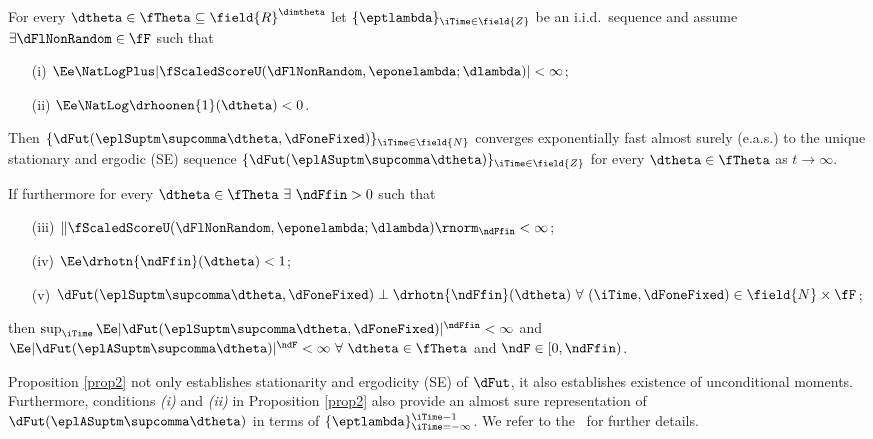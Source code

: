 \begin{prop} \label{prop2} 
For every $\dtheta \in  \fTheta\subseteq \field{R}^{\dimtheta}$ let  
$\{\eptlambda\}_{\iTime \in \field{Z}}$ be an i.i.d.\ sequence and assume
$\exists \dFlNonRandom \in  \fF$  such that 
\begin{enumerate}
    \item[(i)] $\Ee \NatLogPlus |\fScaledScoreU(\dFlNonRandom,\eponelambda;\dlambda)| <\infty$;
    \item[(ii)] $\Ee \NatLog \drhoonen{1}(\dtheta) < 0$.
\end{enumerate}
Then 
$\{ \dFut(\eplSuptm\supcomma\dtheta,\dFoneFixed) \}_{\iTime \in \field{N}}$ 
converges exponentially fast almost surely (e.a.s.) to the unique stationary and ergodic (SE) sequence 
$\{\dFut(\eplASuptm\supcomma\dtheta)\}_{\iTime \in \field{Z}}$ 
for every $\dtheta \in \fTheta$ as $t \to \infty$.

If furthermore for every $\dtheta \in \fTheta\ \exists \ \ndFfin  > 0$ such that 
\begin{enumerate}
    \item[(iii)] $\| \fScaledScoreU(\dFlNonRandom,\eponelambda;\dlambda) \rnorm_{\ndFfin} < \infty$;
    \item[(iv)] $\Ee \drhotn{\ndFfin}(\dtheta) < 1$;
    \item[(v)] $\dFut(\eplSuptm\supcomma\dtheta,\dFoneFixed) \perp \drhotn{\ndFfin}(\dtheta)
    \ \forall \ (\iTime,\dFoneFixed) \in \field{N} \times \fF$;
\end{enumerate}
then 
$\sup_{\iTime} \Ee| \dFut(\eplSuptm\supcomma\dtheta,\dFoneFixed) |^{\ndFfin} < \infty$
and  
$\Ee|\dFut(\eplASuptm\supcomma\dtheta)|^{\ndF} < \infty \ \forall \ \dtheta \in \fTheta$ and $\ndF\in[0,\ndFfin)$.
\end{prop}

Proposition \ref{prop2} not only establishes stationarity and ergodicity (SE) of $\dFut$, 
it also establishes existence of unconditional moments.
Furthermore, conditions \textit{(i)} and \textit{(ii)} in Proposition \ref{prop2} also provide an almost sure representation of $\dFut(\eplASuptm\supcomma\dtheta)$ in terms of $\{\eptlambda\}_{\iTime=-\infty}^{\iTime - 1}$. We refer to the \SupplementaryAppendix\ for further details. 



